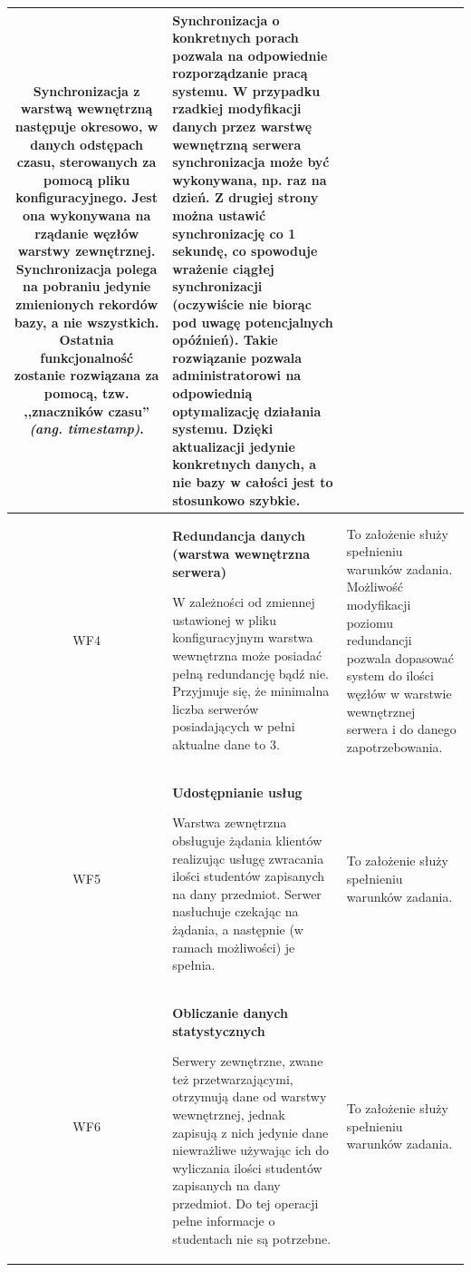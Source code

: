 {\begin{tabularx}{\textwidth}{|c|X|X|}
 Synchronizacja z warstwą wewnętrzną następuje okresowo, w danych odstępach czasu, sterowanych za pomocą pliku konfiguracyjnego. Jest ona wykonywana na rządanie węzłów warstwy zewnętrznej. Synchronizacja polega na pobraniu jedynie zmienionych rekordów bazy, a nie wszystkich. Ostatnia funkcjonalność zostanie rozwiązana za pomocą, tzw. ,,znaczników czasu'' \textit{(ang. timestamp)}. & Synchronizacja o konkretnych porach pozwala na odpowiednie rozporządzanie pracą systemu. W przypadku rzadkiej modyfikacji danych przez warstwę wewnętrzną serwera synchronizacja może być wykonywana, np. raz na dzień. Z drugiej strony można ustawić synchronizację co 1 sekundę, co spowoduje wrażenie ciągłej synchronizacji (oczywiście nie biorąc pod uwagę potencjalnych opóźnień). Takie rozwiązanie pozwala administratorowi na odpowiednią optymalizację działania systemu. Dzięki aktualizacji jedynie konkretnych danych, a nie bazy w całości jest to stosunkowo szybkie. \\
\hline

\label{z:WF4} WF4 & \textbf{Redundancja danych (warstwa wewnętrzna serwera)}

W zależności od zmiennej ustawionej w pliku konfiguracyjnym warstwa wewnętrzna może posiadać pełną redundancję bądź nie. Przyjmuje się, że minimalna liczba serwerów posiadających w pełni aktualne dane to 3. & To założenie służy spełnieniu warunków zadania. Możliwość modyfikacji poziomu redundancji pozwala dopasować system do ilości węzłów w warstwie wewnętrznej serwera i do danego zapotrzebowania.\\
\hline

\label{z:WF5} WF5 & \textbf{Udostępnianie usług }

 Warstwa zewnętrzna obsługuje żądania klientów realizując usługę zwracania ilości studentów zapisanych na dany przedmiot. Serwer nasłuchuje czekając na żądania, a następnie (w ramach możliwości) je spełnia. & To założenie służy spełnieniu warunków zadania. \\
\hline



\label{z:WF6} WF6 & \textbf{Obliczanie danych statystycznych }

  Serwery zewnętrzne, zwane też przetwarzającymi, otrzymują dane od warstwy wewnętrznej, jednak zapisują z nich jedynie dane niewrażliwe używając ich do wyliczania ilości studentów zapisanych na dany przedmiot. Do tej operacji pełne informacje o studentach nie są potrzebne. & 
To założenie służy spełnieniu warunków zadania. \\
\hline


\end{tabularx}}
